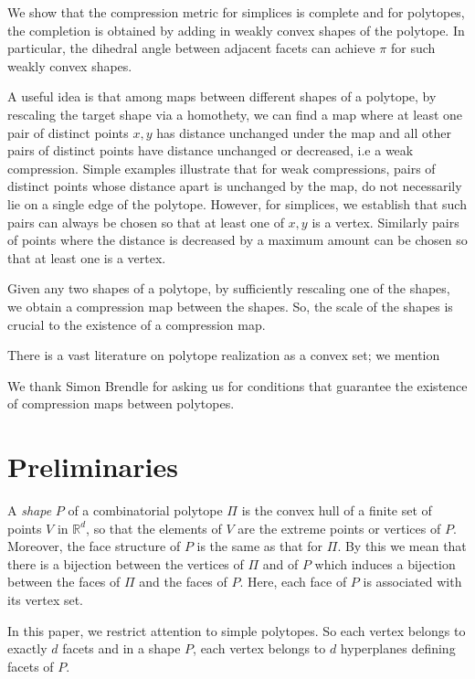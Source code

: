 \documentclass[a4paper, 12pt]{amsart}
\theoremstyle{plain}
\begin{document}
We show that the compression metric for simplices is complete and for polytopes, the completion is obtained by adding in weakly convex shapes of the polytope. In particular, the dihedral angle between adjacent facets can achieve $\pi$ for such weakly convex shapes. 

A useful idea is that among maps between different shapes of a polytope, by rescaling the target shape via a homothety, we can find a map where at least one pair of distinct points $x, y$ has distance unchanged under the map and all other pairs of distinct points have distance unchanged or decreased, i.e a weak compression.  Simple examples illustrate that for weak compressions, pairs of distinct points whose distance apart is unchanged by the map, do not necessarily lie on a single edge of the polytope. However, for simplices, we establish that such pairs can always be chosen so that at least one of $x, y$ is a vertex. Similarly pairs of points where the distance is decreased by a maximum amount can be chosen so that at least one is a vertex. 

Given any two shapes of a polytope, by sufficiently rescaling one of the shapes, we obtain a compression map between the shapes. So, the scale of the shapes is crucial to the existence of a compression map. 

There is a vast literature on polytope realization as a convex set; we mention \cite{alex, grum, schrij, ziegler1}

We thank Simon Brendle for asking us for conditions that guarantee the existence of compression maps between polytopes. 

\section{Preliminaries}
 
A {\it shape} $P$ of a combinatorial polytope $\Pi$ is the convex hull of a finite set of points $V$ in $\mathbb{R}^d$, so that the elements of $V$ are the extreme points or vertices of $P$. Moreover, the face structure of $P$ is the same as that for $\Pi$. By this we mean that there is a bijection between the vertices of $\Pi$ and of $P$ which induces a bijection between the faces of $\Pi$ and the faces of $P$. Here, each face of $P$ is associated with its vertex set. 

In this paper, we restrict attention to simple polytopes. So each vertex belongs to exactly $d$ facets and in a shape $P$, each vertex belongs to $d$ hyperplanes defining facets of $P$. 
\end{document}
